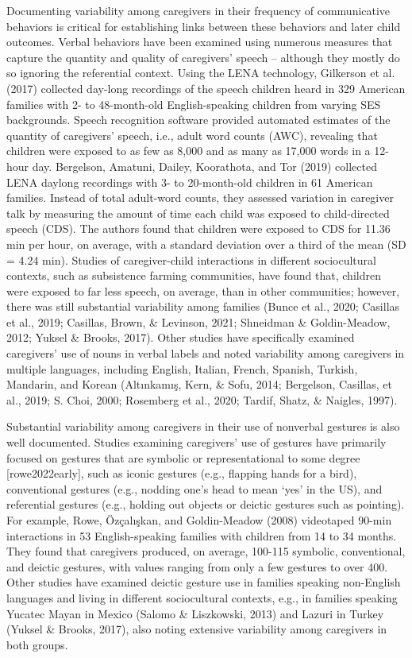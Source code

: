 \documentclass[
  man,floatsintext]{apa6}
\begin{document}
Documenting variability among caregivers in their frequency of communicative behaviors is critical for establishing links between these behaviors and later child outcomes. Verbal behaviors have been examined using numerous measures that capture the quantity and quality of caregivers' speech -- although they mostly do so ignoring the referential context. Using the LENA technology, Gilkerson et al. (2017) collected day-long recordings of the speech children heard in 329 American families with 2- to 48-month-old English-speaking children from varying SES backgrounds. Speech recognition software provided automated estimates of the quantity of caregivers' speech, i.e., adult word counts (AWC), revealing that children were exposed to as few as 8,000 and as many as 17,000 words in a 12-hour day. Bergelson, Amatuni, Dailey, Koorathota, and Tor (2019) collected LENA daylong recordings with 3- to 20-month-old children in 61 American families. Instead of total adult-word counts, they assessed variation in caregiver talk by measuring the amount of time each child was exposed to child-directed speech (CDS). The authors found that children were exposed to CDS for 11.36 min per hour, on average, with a standard deviation over a third of the mean (SD = 4.24 min). Studies of caregiver-child interactions in different sociocultural contexts, such as subsistence farming communities, have found that, children were exposed to far less speech, on average, than in other communities; however, there was still substantial variability among families (Bunce et al., 2020; Casillas et al., 2019; Casillas, Brown, \& Levinson, 2021; Shneidman \& Goldin-Meadow, 2012; Yuksel \& Brooks, 2017). Other studies have specifically examined caregivers' use of nouns in verbal labels and noted variability among caregivers in multiple languages, including English, Italian, French, Spanish, Turkish, Mandarin, and Korean (Altınkamış, Kern, \& Sofu, 2014; Bergelson, Casillas, et al., 2019; S. Choi, 2000; Rosemberg et al., 2020; Tardif, Shatz, \& Naigles, 1997).

Substantial variability among caregivers in their use of nonverbal gestures is also well documented. Studies examining caregivers' use of gestures have primarily focused on gestures that are symbolic or representational to some degree {[}rowe2022early{]}, such as iconic gestures (e.g., flapping hands for a bird), conventional gestures (e.g., nodding one's head to mean `yes' in the US), and referential gestures (e.g., holding out objects or deictic gestures such as pointing). For example, Rowe, Özçalışkan, and Goldin-Meadow (2008) videotaped 90-min interactions in 53 English-speaking families with children from 14 to 34 months. They found that caregivers produced, on average, 100-115 symbolic, conventional, and deictic gestures, with values ranging from only a few gestures to over 400. Other studies have examined deictic gesture use in families speaking non-English languages and living in different sociocultural contexts, e.g., in families speaking Yucatec Mayan in Mexico (Salomo \& Liszkowski, 2013) and Lazuri in Turkey (Yuksel \& Brooks, 2017), also noting extensive variability among caregivers in both groups.
\end{document}
